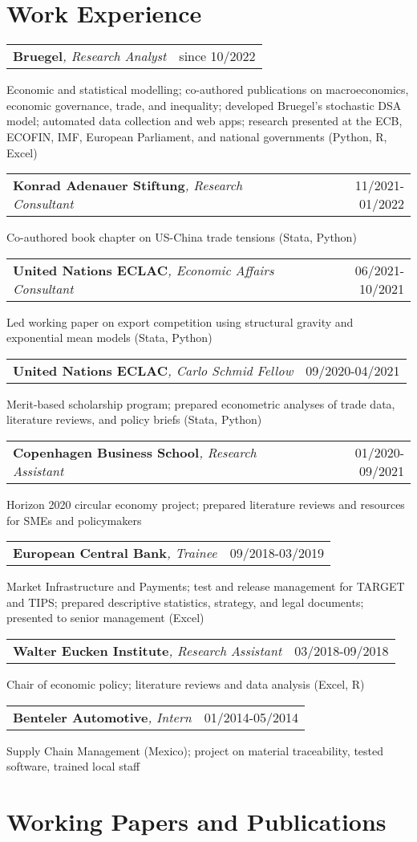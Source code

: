 \documentclass[A4,11pt]{article}
\makeatletter
\newcommand{\Subheading}[4]{   
    \begin{tabular*}{\textwidth}[t]{@{}l @{\extracolsep{\fill}} r@{}}
        \textbf{#1}\textit{\small #2} & \footnotesize #3 \\
    \end{tabular*}
    \small #4 
    \vspace{7pt}
}
\makeatother
\begin{document}
\section{Work Experience}

    \Subheading
        {Bruegel}{, Research Analyst}{since 10/2022}
        {Economic and statistical modelling; co-authored publications on macroeconomics, 
        economic governance, trade, and inequality; 
        developed Bruegel's stochastic DSA model; 
        automated data collection and web apps;
        research presented at the ECB, ECOFIN, IMF, European Parliament, and national governments 
        (Python, R, Excel)}

    \Subheading
        {Konrad Adenauer Stiftung}{, Research Consultant}{11/2021-01/2022}
        {Co-authored book chapter on US-China trade tensions 
        (Stata, Python)}  

    \Subheading
        {United Nations ECLAC}{, Economic Affairs Consultant}{06/2021-10/2021}
        {Led working paper on export competition using structural gravity 
        and exponential mean models (Stata, Python)}

    \Subheading
        {United Nations ECLAC}{, Carlo Schmid Fellow}{09/2020-04/2021}
        {Merit-based scholarship program; prepared econometric analyses of trade data, 
        literature reviews, and policy briefs (Stata, Python)}

    \Subheading
        {Copenhagen Business School}{, Research Assistant}{01/2020-09/2021}
        {Horizon 2020 circular economy project; prepared literature reviews and 
        resources for SMEs and policymakers}

    \Subheading
        {European Central Bank}{, Trainee}{09/2018-03/2019}
        {Market Infrastructure and Payments; test and release management for TARGET 
        and TIPS; prepared descriptive statistics, strategy, and legal documents;
        presented to senior management (Excel)}

    \Subheading
        {Walter Eucken Institute}{, Research Assistant}{03/2018-09/2018}
        {Chair of economic policy; literature reviews and data analysis (Excel, R)}

    \Subheading
        {Benteler Automotive}{, Intern}{01/2014-05/2014}
        {Supply Chain Management (Mexico); project on material traceability, tested software, 
        trained local staff}

\newpage

\section{Working Papers and Publications}
\setlength{}
\begin{refsection}
\nocite{*}
\printbibliography[heading=none]
\end{refsection}
\end{document}
